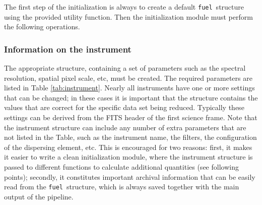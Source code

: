 \documentclass[a4paper]{article}
\newcommand{\fuel}{\texttt{fuel}}
\begin{document}
\begin{sloppypar}
The first step of the initialization is always to create a default \fuel\ structure using the provided utility function. Then the initialization module must perform the following operations.

\subsubsection{Information on the instrument}

The appropriate  structure, containing a set of parameters such as the spectral resolution, spatial pixel scale, etc, must be created. The required parameters are listed in Table \ref{tab:instrument}. Nearly all instruments have one or more settings that can be changed; in these cases it is important that the  structure contains the values that are correct for the specific data set being reduced. Typically these settings can be derived from the FITS header of the first science frame. Note that the instrument structure can include any number of extra parameters that are not listed in the Table, such as the instrument name, the filters, the configuration of the dispersing element, etc. This is encouraged for two reasons: first, it makes it easier to write a clean initialization module, where the instrument structure is passed to different functions to calculate additional quantities (see following points); secondly, it constitutes important archival information that can be easily read from the \fuel\ structure, which is always saved together with the main output of the pipeline.



\end{sloppypar}
\end{document}

